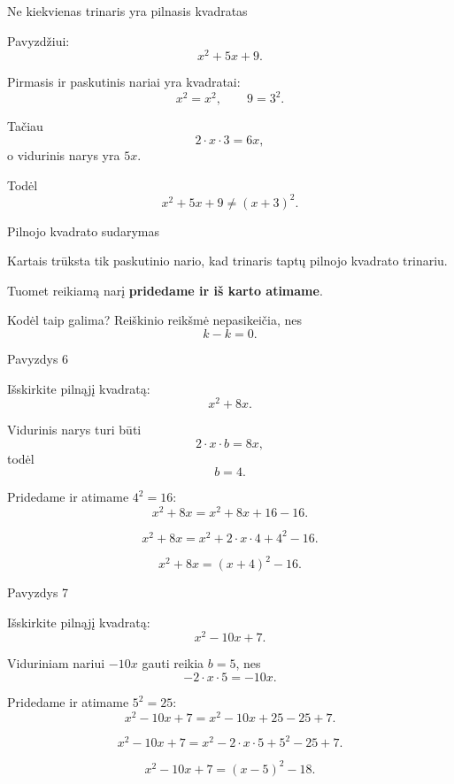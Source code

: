 \documentclass[aspectratio=169,11pt]{beamer}
\begin{document}
\begin{frame}{Ne kiekvienas trinaris yra pilnasis kvadratas}

Pavyzdžiui:
\[
x^2+5x+9.
\]

\pause

Pirmasis ir paskutinis nariai yra kvadratai:
\[
x^2=x^2,
\qquad
9=3^2.
\]

\pause

Tačiau
\[
2\cdot x\cdot3=6x,
\]
o vidurinis narys yra $5x$.

\pause

Todėl
\[
x^2+5x+9\neq(x+3)^2.
\]

\end{frame}

\begin{frame}{Pilnojo kvadrato sudarymas}

Kartais trūksta tik paskutinio nario, kad trinaris taptų
pilnojo kvadrato trinariu.

\pause

Tuomet reikiamą narį \textbf{pridedame ir iš karto atimame}.

\pause

\begin{block}{Kodėl taip galima?}
Reiškinio reikšmė nepasikeičia, nes
\[
k-k=0.
\]
\end{block}

\end{frame}

\begin{frame}{Pavyzdys 6}

Išskirkite pilnąjį kvadratą:
\[
x^2+8x.
\]

\pause

Vidurinis narys turi būti
\[
2\cdot x\cdot b=8x,
\]
todėl
\[
b=4.
\]

\pause

Pridedame ir atimame $4^2=16$:
\[
x^2+8x=x^2+8x+16-16.
\]

\pause

\[
x^2+8x=x^2+2\cdot x\cdot4+4^2-16.
\]

\pause

\[
x^2+8x=(x+4)^2-16.
\]

\end{frame}

\begin{frame}{Pavyzdys 7}

Išskirkite pilnąjį kvadratą:
\[
x^2-10x+7.
\]

\pause

Viduriniam nariui $-10x$ gauti reikia $b=5$, nes
\[
-2\cdot x\cdot5=-10x.
\]

\pause

Pridedame ir atimame $5^2=25$:
\[
x^2-10x+7=x^2-10x+25-25+7.
\]

\pause

\[
x^2-10x+7=x^2-2\cdot x\cdot5+5^2-25+7.
\]

\pause

\[
x^2-10x+7=(x-5)^2-18.
\]

\end{frame}
\end{document}
